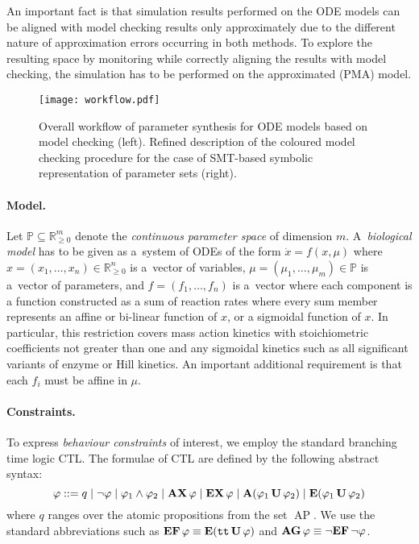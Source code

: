 \documentclass{llncs}
\DeclareMathOperator{\AP}{AP}
\newcommand{\ttrue}{\ensuremath{\texttt{tt}}}
\newcommand{\AX}[1][\varphi]{\ensuremath{\mbox{\textbf{AX}\,}#1}}
\newcommand{\EX}[1][\varphi]{\ensuremath{\mbox{\textbf{EX}\,}#1}}
\newcommand{\EUp}[2][\varphi]{\ensuremath{\mbox{\textbf{E}}({#1}\mbox{\,\textbf{U}\,}{#2})}}
\newcommand{\AU}[1][\varphi]{\ensuremath{\mbox{\textbf{A}}({#1}_1\mbox{\,\textbf{U}\,}{#1}_2)}}
\newcommand{\EU}[1][\varphi]{\ensuremath{\mbox{\textbf{E}}(#1_1\mbox{\,\textbf{U}\,}#1_2)}}
\newcommand{\EF}[1][\varphi]{\ensuremath{\mbox{\textbf{EF}\,}#1}}
\newcommand{\AG}[1][\varphi]{\ensuremath{\mbox{\textbf{AG}\,}#1}}
\begin{document}
An important fact is that simulation results performed on the ODE models can be aligned with model checking results only approximately due to the different nature of approximation errors occurring in both methods. To explore the resulting space by monitoring while correctly aligning the results with model checking, the simulation has to be performed on the approximated (PMA) model.

\begin{figure}
\begin{center}
\texttt{[image: workflow.pdf]}
\vspace*{-1cm}
\end{center}
\caption{Overall workflow of parameter synthesis for ODE models based on model checking (left). Refined description of the coloured model checking procedure for the case of SMT-based symbolic representation of parameter sets (right).}  
\label{fig:workflow}
\end{figure}
\enlargethispage*{8mm}

\paragraph{Model.}
Let $\mathbb{P}\subseteq \mathbb{R}^m_{\geq 0}$ denote the \emph{continuous parameter space} of dimension $m$.
A~\emph{biological model}
has to be given as a~system of ODEs of the form $\dot x = f(x, \mu)$ where $x = (x_1, \ldots, x_n)\in\mathbb{R}^n_{\geq 0}$ is a~vector
of variables, $\mu = (\mu_1, \ldots, \mu_m)\in\mathbb{P}$ is a~vector of parameters,
and $f = (f_1, \ldots, f_n)$ is a~vector where each component is a function constructed as a sum of reaction rates where every sum member represents an affine or bi-linear function of $x$, or a sigmoidal function of $x$. In particular, this restriction covers mass action kinetics with stoichiometric coefficients not greater than one and any sigmoidal kinetics such as all significant variants of enzyme or Hill kinetics. An important additional requirement is that each $f_i$ must be affine in $\mu$.

\paragraph{Constraints.} 
To express \emph{behaviour constraints} of interest, we employ the standard branching time logic
CTL. The formulae of CTL are defined by the following abstract syntax:
\[ \varphi ::= q \mid \neg\varphi \mid \varphi_1\wedge\varphi_2
	\mid \AX \mid \EX \mid \AU \mid \EU \]
where $q$ ranges over the atomic propositions from the set $\AP$.
We use the standard abbreviations such as $\EF \equiv \EUp[\ttrue]{\varphi}$
and $\AG \equiv \neg \EF[\neg\varphi]$.
\end{document}
